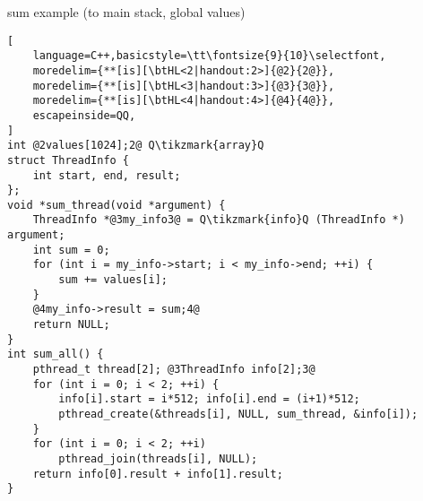 \usetikzlibrary{arrows.meta,calc,decorations.pathreplacing,patterns,positioning}

\begin{frame}[fragile,label=sumToStack]{sum example (to main stack, global values)}
\begin{lstlisting}[
    language=C++,basicstyle=\tt\fontsize{9}{10}\selectfont,
    moredelim={**[is][\btHL<2|handout:2>]{@2}{2@}},
    moredelim={**[is][\btHL<3|handout:3>]{@3}{3@}},
    moredelim={**[is][\btHL<4|handout:4>]{@4}{4@}},
    escapeinside=QQ,
]
int @2values[1024];2@ Q\tikzmark{array}Q
struct ThreadInfo {
    int start, end, result;
};
void *sum_thread(void *argument) {
    ThreadInfo *@3my_info3@ = Q\tikzmark{info}Q (ThreadInfo *) argument;
    int sum = 0;
    for (int i = my_info->start; i < my_info->end; ++i) {
        sum += values[i];
    }
    @4my_info->result = sum;4@
    return NULL;
}
int sum_all() {
    pthread_t thread[2]; @3ThreadInfo info[2];3@
    for (int i = 0; i < 2; ++i) {
        info[i].start = i*512; info[i].end = (i+1)*512;
        pthread_create(&threads[i], NULL, sum_thread, &info[i]);
    }
    for (int i = 0; i < 2; ++i)
        pthread_join(threads[i], NULL);
    return info[0].result + info[1].result;
}
\end{lstlisting}
\end{frame}

